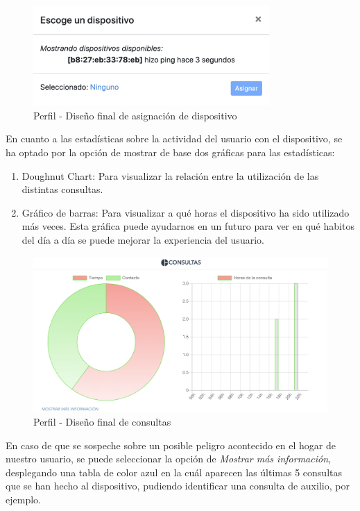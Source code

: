 \begin{enumerate}
    \begin{figure}[H]   
        \centering
        \includegraphics[width=9cm]{./img/web2/profile.add.device.png}
        \caption{Perfil - Diseño final de asignación de dispositivo}
        \label{fig:perfil.asign-device.post}
    \end{figure}
    
    En cuanto a las estadísticas sobre la actividad del usuario con el dispositivo, se ha optado por la opción de mostrar de base dos gráficas para las estadísticas:
    \begin{enumerate}
        \item Doughnut Chart: Para visualizar la relación entre la utilización de las distintas consultas.
        \item Gráfico de barras: Para visualizar a qué horas el dispositivo ha sido utilizado más veces. Esta gráfica puede ayudarnos en un futuro para ver en qué habitos del día a día se puede mejorar la experiencia del usuario.
    \end{enumerate}
    
    \begin{figure}[H]   
        \centering
        \includegraphics[width=12cm]{./img/web2/profile.stats.png}
        \caption{Perfil - Diseño final de consultas}
        \label{fig:perfil.consult.post}
    \end{figure}

    En caso de que se sospeche sobre un posible peligro acontecido en el hogar de nuestro usuario, se puede seleccionar la opción de \textit{Mostrar más información}, desplegando una tabla de color azul en la cuál aparecen las últimas 5 consultas que se han hecho al dispositivo, pudiendo identificar una consulta de auxilio, por ejemplo.
    

\end{enumerate}
